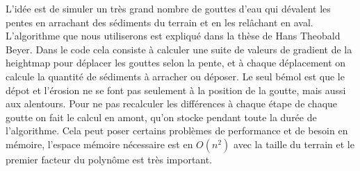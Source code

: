\documentclass{EPUProjetDi}
\begin{document}
L'idée est de simuler un très grand nombre de gouttes d'eau qui dévalent les pentes en arrachant des sédiments du terrain et en les relâchant en aval. L'algorithme que nous utiliserons est expliqué dans la thèse de Hans Theobald Beyer\cite{erosion}.
Dans le code cela consiste à calculer une suite de valeurs de gradient de la heightmap pour déplacer les gouttes selon la pente, et à chaque déplacement on calcule la quantité de sédiments à arracher ou déposer. Le seul bémol est que le dépot et l'érosion ne se font pas seulement à la position de la goutte, mais aussi aux alentours. Pour ne pas recalculer les différences à chaque étape de chaque goutte on fait le calcul en amont, qu'on stocke pendant toute la durée de l'algorithme. Cela peut poser certains problèmes de performance et de besoin en mémoire, l'espace mémoire nécessaire est en $O(n^2)$ avec la taille du terrain et le premier facteur du polynôme est très important.
\end{document}
